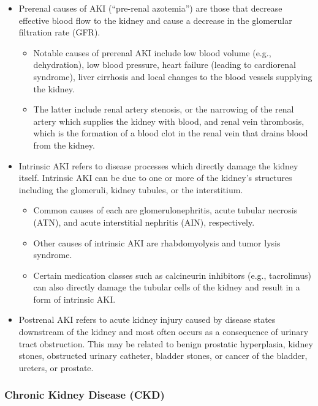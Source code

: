 \documentclass{article}
\begin{document}
\begin{itemize}
    \item Prerenal causes of AKI (``pre-renal azotemia'') are those that decrease effective blood flow to the kidney and cause a decrease in the glomerular filtration rate (GFR).
        \begin{itemize}
            \item Notable causes of prerenal AKI include low blood volume (e.g., dehydration), low blood pressure, heart failure (leading to cardiorenal syndrome), liver cirrhosis and local changes to the blood vessels supplying the kidney. 
            \item The latter include renal artery stenosis, or the narrowing of the renal artery which supplies the kidney with blood, and renal vein thrombosis, which is the formation of a blood clot in the renal vein that drains blood from the kidney.
        \end{itemize}
    \item Intrinsic AKI refers to disease processes which directly damage the kidney itself. Intrinsic AKI can be due to one or more of the kidney's structures including the glomeruli, kidney tubules, or the interstitium. 
        \begin{itemize}
            \item Common causes of each are glomerulonephritis, acute tubular necrosis (ATN), and acute interstitial nephritis (AIN), respectively. 
            \item Other causes of intrinsic AKI are rhabdomyolysis and tumor lysis syndrome.
            \item Certain medication classes such as calcineurin inhibitors (e.g., tacrolimus) can also directly damage the tubular cells of the kidney and result in a form of intrinsic AKI.
        \end{itemize}
    \item Postrenal AKI refers to acute kidney injury caused by disease states downstream of the kidney and most often occurs as a consequence of urinary tract obstruction. This may be related to benign prostatic hyperplasia, kidney stones, obstructed urinary catheter, bladder stones, or cancer of the bladder, ureters, or prostate.
\end{itemize}

\subsubsection{Chronic Kidney Disease (CKD)}
\end{document}
